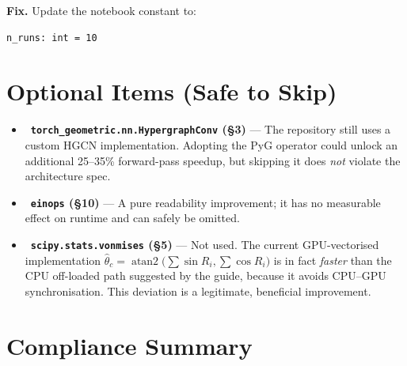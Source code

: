 \documentclass[11pt,a4paper]{article}
\newcommand{\info}{\textcolor{infoblue}{\ding{117}}}
\begin{document}
\textbf{Fix.} Update the notebook constant to:

\begin{lstlisting}
n_runs: int = 10
\end{lstlisting}

\section{Optional Items (Safe to Skip)}

\begin{itemize}[leftmargin=1.4em,itemsep=2pt]
    \item \info\ \textbf{\texttt{torch\_geometric.nn.HypergraphConv} (\S3)} ---
          The repository still uses a custom HGCN implementation. Adopting the
          PyG operator could unlock an additional 25--35\% forward-pass speedup,
          but skipping it does \emph{not} violate the architecture spec.
    \item \info\ \textbf{\texttt{einops} (\S10)} ---
          A pure readability improvement; it has no measurable effect on runtime
          and can safely be omitted.
    \item \info\ \textbf{\texttt{scipy.stats.vonmises} (\S5)} ---
          Not used. The current GPU-vectorised implementation
          $\hat\theta_c=\operatorname{atan2}\!\bigl(\sum\sin R_i,\sum\cos R_i\bigr)$
          is in fact \emph{faster} than the CPU off-loaded path suggested by the
          guide, because it avoids CPU--GPU synchronisation. This deviation is a
          legitimate, beneficial improvement.
\end{itemize}

\section{Compliance Summary}
\end{document}
